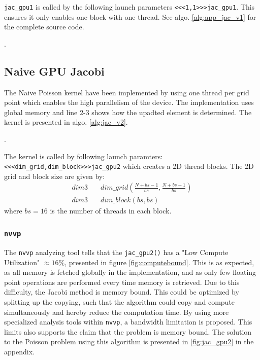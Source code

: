 \noindent \texttt{jac\_gpu1} is called by the following launch parameters \texttt{<<<1,1>>>jac\_gpu1}. This ensures it only enables one block with one thread. See algo. \ref{alg:app_jac_v1} for the complete source code.

.

\subsection{Naive GPU Jacobi}
The Naive Poisson kernel have been implemented by using one thread per grid point which enables the high parallelism of the device. The implementation uses global memory and line 2-3 shows how the upadted element is determined. The kernel is presented in algo. \ref{alg:jac_v2}.

. 


\noindent The kernel is called by following launch paramters: \texttt{<<<dim\_grid,dim\_block>>>jac\_gpu2} which creates a 2D thread blocks. The 2D grid and block size are given by:
\begin{align}
dim3 \quad &dim\_grid \left(  \frac { N+bs-1 }{ bs },\frac { N+bs-1 }{ bs } \right)  \\
dim3\quad  &dim\_block\left(bs, bs \right)
\end{align}
where $bs=16$ is the number of threads in each block.


\subsubsection{\texttt{nvvp}}
The \texttt{nvvp} analyzing tool tells that the \texttt{jac\_gpu2()} has a "Low Compute Utilization" $\approx 16\%$, presented in figure \ref{fig:computebound}. This is as expected, as all memory is fetched globally in the implementation, and as only few floating point operations are performed every time memory is retrieved. Due to this difficulty, the Jacobi method is memory bound. This could be optimized by splitting up the copying, such that the algorithm could copy and compute simultaneously and hereby reduce the computation time. By using more specialized analysis tools within \texttt{nvvp}, a bandwidth limitation is proposed. This limits also supports the claim that the problem is memory bound.  The solution to the Poisson problem using this algorithm is presented in \ref{fig:jac_gpu2} in the appendix.\\


